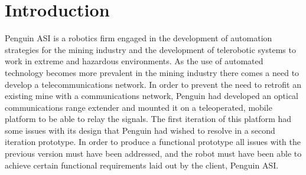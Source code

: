 \section{Introduction}
Penguin ASI is a robotics firm engaged in the development of automation strategies for the mining industry and the development of telerobotic systems to work in extreme and hazardous environments. As the use of automated technology becomes more prevalent in the mining industry there comes a need to develop a telecommunications network. In order to prevent the need to retrofit an existing mine with a communications network, Penguin had developed an optical communications range extender and mounted it on a teleoperated, mobile platform to be able to relay the signals. The first iteration of this platform had some issues with its design that Penguin had wished to resolve in a second iteration prototype. In order to produce a functional prototype all issues with the previous version must have been addressed, and the robot must have been able to achieve certain functional requirements laid out by the client, Penguin ASI.  
